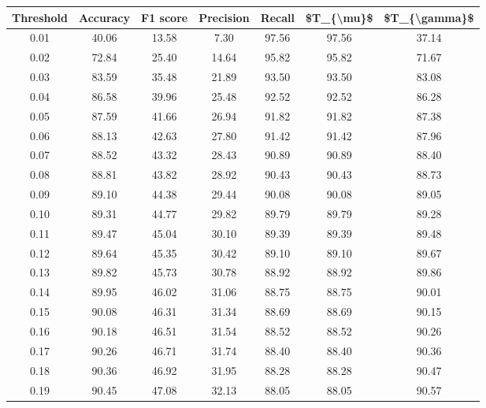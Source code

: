 \begin{tabular}{|c|c|c|c|c|c|c|}
\toprule
 Threshold &  Accuracy &  F1 score &  Precision &  Recall &  \$T\_\{\textbackslash mu\}\$ &  \$T\_\{\textbackslash gamma\}\$ \\
\hline
      0.01 &     40.06 &     13.58 &       7.30 &   97.56 &      97.56 &         37.14 \\
      0.02 &     72.84 &     25.40 &      14.64 &   95.82 &      95.82 &         71.67 \\
      0.03 &     83.59 &     35.48 &      21.89 &   93.50 &      93.50 &         83.08 \\
      0.04 &     86.58 &     39.96 &      25.48 &   92.52 &      92.52 &         86.28 \\
      0.05 &     87.59 &     41.66 &      26.94 &   91.82 &      91.82 &         87.38 \\
      0.06 &     88.13 &     42.63 &      27.80 &   91.42 &      91.42 &         87.96 \\
      0.07 &     88.52 &     43.32 &      28.43 &   90.89 &      90.89 &         88.40 \\
      0.08 &     88.81 &     43.82 &      28.92 &   90.43 &      90.43 &         88.73 \\
      0.09 &     89.10 &     44.38 &      29.44 &   90.08 &      90.08 &         89.05 \\
      0.10 &     89.31 &     44.77 &      29.82 &   89.79 &      89.79 &         89.28 \\
      0.11 &     89.47 &     45.04 &      30.10 &   89.39 &      89.39 &         89.48 \\
      0.12 &     89.64 &     45.35 &      30.42 &   89.10 &      89.10 &         89.67 \\
      0.13 &     89.82 &     45.73 &      30.78 &   88.92 &      88.92 &         89.86 \\
      0.14 &     89.95 &     46.02 &      31.06 &   88.75 &      88.75 &         90.01 \\
      0.15 &     90.08 &     46.31 &      31.34 &   88.69 &      88.69 &         90.15 \\
      0.16 &     90.18 &     46.51 &      31.54 &   88.52 &      88.52 &         90.26 \\
      0.17 &     90.26 &     46.71 &      31.74 &   88.40 &      88.40 &         90.36 \\
      0.18 &     90.36 &     46.92 &      31.95 &   88.28 &      88.28 &         90.47 \\
      0.19 &     90.45 &     47.08 &      32.13 &   88.05 &      88.05 &         90.57 \\

\end{tabular}
